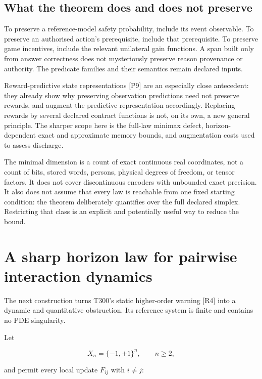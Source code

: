 \documentclass[11pt,a4paper]{article}
\begin{document}
\subsection{What the theorem does and does not
preserve}\label{what-the-theorem-does-and-does-not-preserve}

To preserve a reference-model safety probability, include its event
observable. To preserve an authorised action's prerequisite, include
that prerequisite. To preserve game incentives, include the relevant
unilateral gain functions. A span built only from answer correctness
does not mysteriously preserve reason provenance or authority. The
predicate families and their semantics remain declared inputs.

Reward-predictive state representations {[}P9{]} are an especially close
antecedent: they already show why preserving observation predictions
need not preserve rewards, and augment the predictive representation
accordingly. Replacing rewards by several declared contract functions is
not, on its own, a new general principle. The sharper scope here is the
full-law minimax defect, horizon-dependent exact and approximate memory
bounds, and augmentation costs used to assess discharge.

The minimal dimension is a count of exact continuous real coordinates,
not a count of bits, stored words, persons, physical degrees of freedom,
or tensor factors. It does not cover discontinuous encoders with
unbounded exact precision. It also does not assume that every law is
reachable from one fixed starting condition: the theorem deliberately
quantifies over the full declared simplex. Restricting that class is an
explicit and potentially useful way to reduce the bound.

\section{A sharp horizon law for pairwise interaction
dynamics}\label{a-sharp-horizon-law-for-pairwise-interaction-dynamics}

The next construction turns T300's static higher-order warning {[}R4{]}
into a dynamic and quantitative obstruction. Its reference system is
finite and contains no PDE singularity.

Let

\nopagebreak[4]

\[
X_n=\{-1,+1\}^n,\qquad n\ge2,
\]

and permit every local update \(F_{ij}\) with \(i\ne j\):
\end{document}

